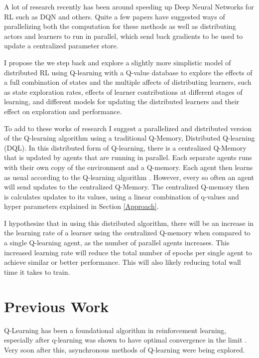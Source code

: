 \documentclass[jair,twoside,11pt,theapa]{article}
\begin{document}
A lot of research recently has been around speeding up Deep Neural Networks for RL such as DQN and others. Quite a few papers have suggested ways of parallelizing both the computation for these methods as well as distributing actors and learners to run in parallel, which send back gradients to be used to update a centralized parameter store. 

I propose the we step back and explore a slightly more simplistic model of distributed RL using Q-learning with a Q-value database to explore the effects of a full combination of states and the multiple affects of distributing learners, such as state exploration rates, effects of learner contributions at different stages of learning, and different models for updating the distributed learners and their effect on exploration and performance. 

To add to these works of research I suggest a parallelized and distributed version of the Q-learning algorithm using a traditional Q-Memory, Distributed Q-learning (DQL).
In this distributed form of Q-learning, there is a centralized Q-Memory that is updated by agents that are running in parallel. Each separate agents runs with their own copy of the environment and a Q-memory. Each agent then learns as usual according to the Q-learning algorithm \cite{watkins}. However, every so often an agent will send updates to the centralized 
Q-Memory. 
The centralized Q-memory then is calculates updates to its values, using a linear combination of q-values and hyper parameters explained in Section \ref{Approach}. 

I hypothesize that in using this distributed algorithm, there will be an increase in the learning rate of a learner using the centralized Q-memory when compared to a single Q-learning agent, as the number of parallel agents increases. This increased learning rate will reduce the total number of epochs per single agent to achieve similar or better performance. This will also likely reducing total wall time it takes to train. 

\section{Previous Work}
\label{Literature Survey}
Q-Learning \cite{watkins} has been a foundational algorithm in reinforcement learning, especially after q-learning was shown to have optimal convergence in the limit \cite{qlearning}. Very soon after this, asynchronous methods of Q-learning were being explored.  
\end{document}
